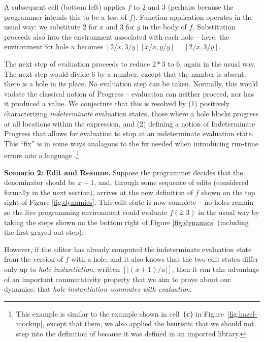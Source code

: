 A subsequent cell (bottom left) applies $f$ to $2$ and $3$ (perhaps because the programmer intends this to be a test of $f$). Function application operates in the usual way: 
we substitute $2$ for $x$ and $3$ for $y$ in the body of $f$. Substitution proceeds also into the environment associated with each hole -- here, the environment for hole $u$ becomes $[2/x, 3/y][x/x, y/y] = [2/x, 3/y]$.

The next step of evaluation proceeds to reduce $2 * 3$ to $6$, again in the usual way.
%
The next step would divide $6$ by a number, except that the number is
absent; there is a hole in its place. No evaluation step can be taken. 
%
Normally, this would violate the classical notion of Progress -- 
evaluation can neither proceed, nor has it produced a value. We conjecture that this is
resolved by (1) positively characterizing \emph{indeterminate} 
evaluation states, those where a hole blocks progress at all locations
within the expression, and (2) defining
a notion of Indeterminate Progress that allows for evaluation to stop at an 
indeterminate evaluation state. This ``fix'' is in some ways analagous to the fix needed when introducing 
run-time errors into a language \cite{pfpl}.\footnote{%
This example is similar to the example shown in cell~\textbf{(c)} in
Figure~\ref{fig:hazel-mockup}, except that there, we also applied
the heuristic that we should not step
into the definition of  because it was defined in an imported library.}

\vspace{0.25ex}
\noindent\textbf{Scenario 2: Edit and Resume.}
Suppose the programmer decides that the denominator should
be $x+1$, and, through some sequence of edits (considered formally in the next section), arrives at 
the new definition of $f$ shown on the top right of Figure \ref{fig:dynamics}. This edit state is now complete -- no holes remain -- so the live programming environment 
could evaluate $f(2, 3)$ in the usual way by taking the steps shown on
the bottom right of Figure \ref{fig:dynamics} (including the first
grayed out step).

However, if the editor has already computed the indeterminate evaluation 
state from the version of $f$ with a hole, and it also knows that the 
two edit states differ only up to \emph{hole instantiation}, written 
$[\!| (x+1) / u
|\!]$, then it can take advantage of an important commutativity property that we aim 
to prove about our dynamics: that 
\emph{hole instantiation commutes with evaluation}. 

